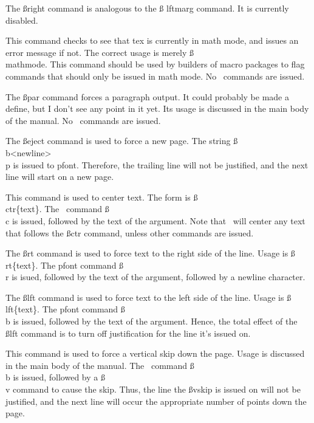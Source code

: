 { The {\ss right} command is analogous to the {\ss
lftmarg} command. It is currently disabled.

 This command checks to see that tex is currently
in math mode, and issues an error message if not. The correct
usage is merely {\ss \\mathmode.} This command should be used by
builders of macro packages to flag commands that should only be
issued in math mode. No \pfont\ commands are issued.

 The {\ss par} command forces a paragraph output. It
could probably be made a define, but I don't see any point in it
yet. Its usage is discussed in the main body of the manual. No
\pfont\ commands are issued.

 The {\ss eject} command is used to force a new page.
The string  {\ss \\b<newline>\\p} is issued to pfont. Therefore,
the trailing line will not be justified, and the next line will
start on a new page.

 This command is used to center text. The form is {\ss
\\ctr\{text\}.} The \pfont\ command {\ss \\c} is issued, followed
by the text of the argument. Note that \pfont\ will center any
text that follows the {\ss ctr} command, unless other commands
are issued.

 The {\ss rt} command is used to force text to the right
side of the line. Usage is {\ss \\rt\{text\}.} The pfont command
{\ss \\r} is isued, followed by the text of the argument,
followed by a newline character.

 The {\ss lft} command is used to force text to the
left side of the line. Usage is {\ss \\lft\{text\}.} The pfont
command {\ss \\b} is issued, followed by the text of the
argument. Hence, the total effect of the {\ss lft} command is to
turn off justification for the line it's issued on.

 This command is used to force a vertical skip down
the page. Usage is discussed in the main body of the manual. The
\pfont\ command {\ss \\b} is issued, followed by a {\ss \\v}
command to cause the skip. Thus, the line the {\ss vskip} is
issued on will not be justified, and the next line will occur the
appropriate number of points down the page.

}
